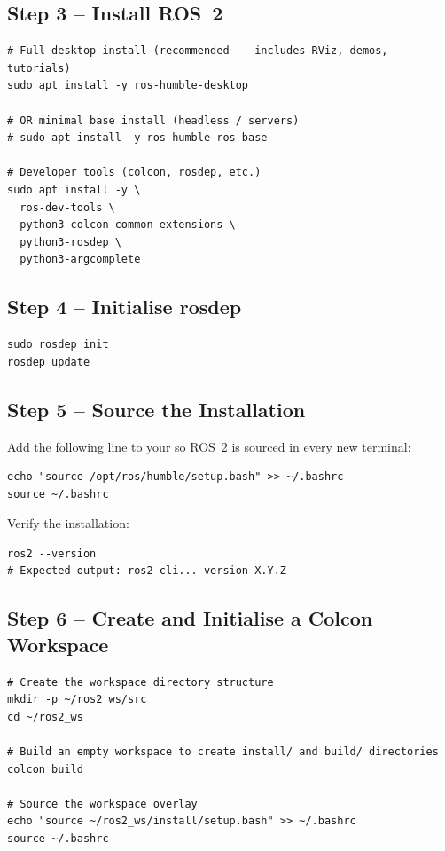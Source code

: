 \documentclass[11pt,a4paper]{csarticle}
\begin{document}
\subsection{Step 3 -- Install ROS~2}

\begin{lstlisting}[style=bash]
# Full desktop install (recommended -- includes RViz, demos, tutorials)
sudo apt install -y ros-humble-desktop

# OR minimal base install (headless / servers)
# sudo apt install -y ros-humble-ros-base

# Developer tools (colcon, rosdep, etc.)
sudo apt install -y \
  ros-dev-tools \
  python3-colcon-common-extensions \
  python3-rosdep \
  python3-argcomplete
\end{lstlisting}

\subsection{Step 4 -- Initialise rosdep}

\begin{lstlisting}[style=bash]
sudo rosdep init
rosdep update
\end{lstlisting}

\subsection{Step 5 -- Source the Installation}

Add the following line to your  so ROS~2 is
sourced in every new terminal:

\begin{lstlisting}[style=bash]
echo "source /opt/ros/humble/setup.bash" >> ~/.bashrc
source ~/.bashrc
\end{lstlisting}

Verify the installation:
\begin{lstlisting}[style=bash]
ros2 --version
# Expected output: ros2 cli... version X.Y.Z
\end{lstlisting}

\subsection{Step 6 -- Create and Initialise a Colcon Workspace}

\begin{lstlisting}[style=bash]
# Create the workspace directory structure
mkdir -p ~/ros2_ws/src
cd ~/ros2_ws

# Build an empty workspace to create install/ and build/ directories
colcon build

# Source the workspace overlay
echo "source ~/ros2_ws/install/setup.bash" >> ~/.bashrc
source ~/.bashrc
\end{lstlisting}
\end{document}
